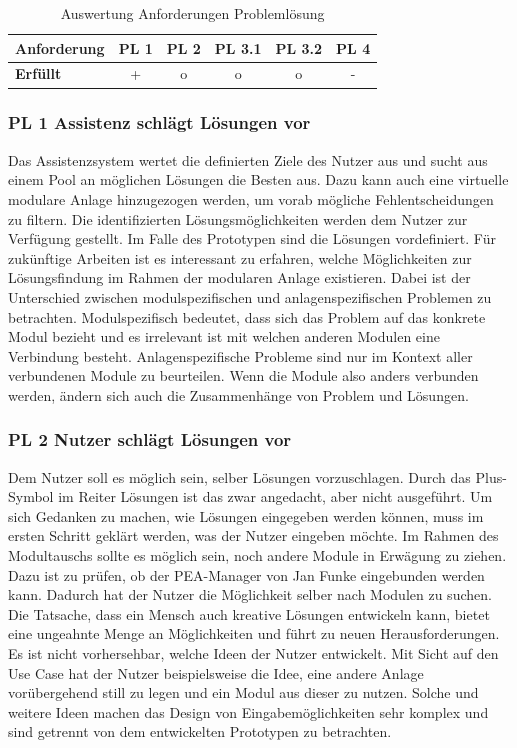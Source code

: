 \begin{table}[htb]
\caption{Auswertung Anforderungen Problemlösung}
\centering
\begin{tabular}{l|c|c|c|c|c}
\textbf{Anforderung} & PL 1 & PL 2 & PL 3.1 & PL 3.2 & PL 4 \\
\hline
\textbf{Erfüllt} & + & o & o & o & - \\
\end{tabular}
\label{tab:Anforderungen-Problemlösung}
\end{table}

\subsubsection*{PL 1 Assistenz schlägt Lösungen vor}
Das Assistenzsystem wertet die definierten Ziele des Nutzer aus und sucht aus einem Pool an möglichen Lösungen die Besten aus. Dazu kann auch eine virtuelle modulare Anlage hinzugezogen werden, um vorab mögliche Fehlentscheidungen zu filtern. Die identifizierten Lösungsmöglichkeiten werden dem Nutzer zur Verfügung gestellt. Im Falle des Prototypen sind die Lösungen vordefiniert. Für zukünftige Arbeiten ist es interessant zu erfahren, welche Möglichkeiten zur Lösungsfindung im Rahmen der modularen Anlage existieren. Dabei ist der Unterschied zwischen modulspezifischen und anlagenspezifischen Problemen zu betrachten. Modulspezifisch bedeutet, dass sich das Problem auf das konkrete Modul bezieht und es irrelevant ist mit welchen anderen Modulen eine Verbindung besteht. Anlagenspezifische Probleme sind nur im Kontext aller verbundenen Module zu beurteilen. Wenn die Module also anders verbunden werden, ändern sich auch die Zusammenhänge von Problem und Lösungen.

\subsubsection*{PL 2 Nutzer schlägt Lösungen vor}
Dem Nutzer soll es möglich sein, selber Lösungen vorzuschlagen. Durch das Plus-Symbol im Reiter Lösungen ist das zwar angedacht, aber nicht ausgeführt. Um sich Gedanken zu machen, wie Lösungen eingegeben werden können, muss im ersten Schritt geklärt werden, was der Nutzer eingeben möchte. Im Rahmen des Modultauschs sollte es möglich sein, noch andere Module in Erwägung zu ziehen. Dazu ist zu prüfen, ob der PEA-Manager von Jan Funke \cite{Funke2018} eingebunden werden kann. Dadurch hat der Nutzer die Möglichkeit selber nach Modulen zu suchen. Die Tatsache, dass ein Mensch auch kreative Lösungen entwickeln kann, bietet eine ungeahnte Menge an Möglichkeiten und führt zu neuen Herausforderungen. Es ist nicht vorhersehbar, welche Ideen der Nutzer entwickelt. Mit Sicht auf den Use Case hat der Nutzer beispielsweise die Idee, eine andere Anlage vorübergehend still zu legen und ein Modul aus dieser zu nutzen. Solche und weitere Ideen machen das Design von Eingabemöglichkeiten sehr komplex und sind getrennt von dem entwickelten Prototypen zu betrachten.

